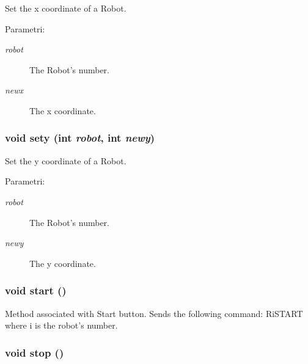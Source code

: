 Set the x coordinate of a Robot. \begin{Desc}
\item[Parametri:]
\begin{description}
\item[{\em robot}]The Robot's number. \item[{\em newx}]The x coordinate. \end{description}
\end{Desc}
\hypertarget{classMainWindow_5ee21538a4cacfcb64a9b504729f2026}{
\subsubsection[sety]{\setlength{\rightskip}{0pt plus 5cm}void sety (int {\em robot}, int {\em newy})}}
\label{classMainWindow_5ee21538a4cacfcb64a9b504729f2026}


Set the y coordinate of a Robot. \begin{Desc}
\item[Parametri:]
\begin{description}
\item[{\em robot}]The Robot's number. \item[{\em newy}]The y coordinate. \end{description}
\end{Desc}
\hypertarget{classMainWindow_60de64d75454385b23995437f1d72669}{
\subsubsection[start]{\setlength{\rightskip}{0pt plus 5cm}void start ()}}
\label{classMainWindow_60de64d75454385b23995437f1d72669}


Method associated with Start button. Sends the following command: Ri\-START where i is the robot's number. \hypertarget{classMainWindow_8c528baf37154d347366083f0f816846}{
\subsubsection[stop]{\setlength{\rightskip}{0pt plus 5cm}void stop ()}}
\label{classMainWindow_8c528baf37154d347366083f0f816846}


